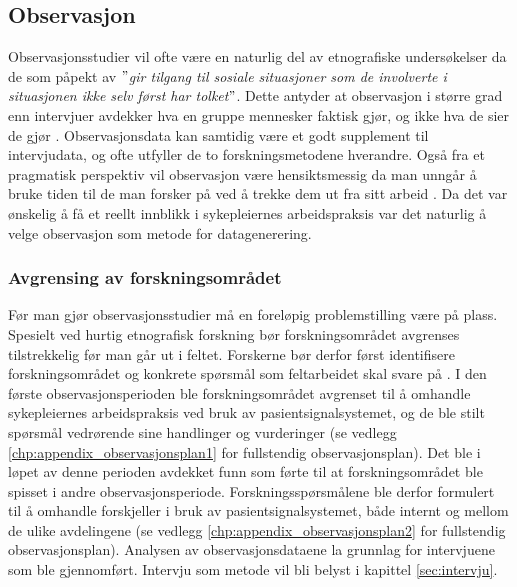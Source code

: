 \subsection{Observasjon}
\label{section:observasjon}
Observasjonsstudier vil ofte være en naturlig del av etnografiske undersøkelser da de som påpekt av \citet{Tjora} \textit{$"$gir tilgang til sosiale situasjoner som de involverte i situasjonen ikke selv først har tolket$"$}. Dette antyder at observasjon i større grad enn intervjuer avdekker hva en gruppe mennesker faktisk gjør, og ikke hva de sier de gjør \citep{Oates, Blomberg93, Tjora}. Observasjonsdata kan samtidig være et godt supplement til intervjudata, og ofte utfyller de to forskningsmetodene hverandre. Også fra et pragmatisk perspektiv vil observasjon være hensiktsmessig da man unngår å bruke tiden til de man forsker på ved å trekke dem ut fra sitt arbeid \citep{Tjora}. Da det var ønskelig å få et reellt innblikk i sykepleiernes arbeidspraksis var det naturlig å velge observasjon som metode for datagenerering.
 
\noindent
\subsubsection{Avgrensing av forskningsområdet}
Før man gjør observasjonsstudier må en foreløpig problemstilling være på plass. Spesielt ved hurtig etnografisk forskning bør forskningsområdet avgrenses tilstrekkelig før man går ut i feltet. Forskerne bør derfor først identifisere forskningsområdet og konkrete spørsmål som feltarbeidet skal svare på \citep{Tjora, Millen00}. I den første observasjonsperioden ble forskningsområdet avgrenset til å omhandle sykepleiernes arbeidspraksis ved bruk av pasientsignalsystemet, og de ble stilt spørsmål vedrørende sine handlinger og vurderinger (se vedlegg \ref{chp:appendix_observasjonsplan1} for fullstendig observasjonsplan). Det ble i løpet av denne perioden avdekket funn som førte til at forskningsområdet ble spisset i andre observasjonsperiode. Forskningsspørsmålene ble derfor formulert til å omhandle forskjeller i bruk av pasientsignalsystemet, både internt og mellom de ulike avdelingene (se vedlegg \ref{chp:appendix_observasjonsplan2} for fullstendig observasjonsplan). Analysen av observasjonsdataene la grunnlag for intervjuene som ble gjennomført. Intervju som metode vil bli belyst i kapittel \ref{sec:intervju}.

